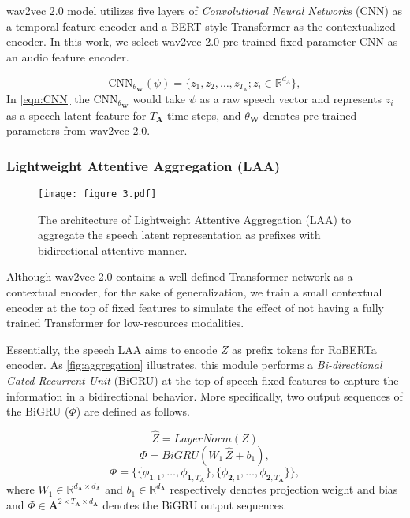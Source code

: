 \documentclass[letterpaper]{article} \usepackage{spconf,amsmath,graphicx}
\begin{document}
wav2vec 2.0 model \cite{baevski2020wav2vec} utilizes five layers of \textit{Convolutional Neural Networks} (CNN) as a temporal feature encoder and a BERT-style Transformer as the contextualized encoder. In this work, we select wav2vec 2.0 pre-trained fixed-parameter CNN as an audio feature encoder.

\begin{equation}
\label{eqn:CNN}
    \text{CNN}_{\theta_{\mathbf{W}}}(\psi) = \{z_1, z_2, \dots, z_{T_{\mathbb{A}}}; z_{i} \in \mathbb{R}^{d_{A}}\},
\end{equation}In \autoref{eqn:CNN} the CNN$_{\theta_{\mathbf{W}}}$ would take $\psi$ as a raw speech vector and represents $z_{i}$ as a speech latent feature for $T_{\mathbf{A}}$ time-steps, and  $\theta_{\mathbf{W}}$ denotes pre-trained parameters from wav2vec 2.0.

\subsubsection{Lightweight Attentive Aggregation (LAA)}


\begin{figure}[tp]
\centering
\texttt{[image: figure\_3.pdf]} \caption{The architecture of Lightweight Attentive Aggregation (LAA) to aggregate the speech latent representation as prefixes with bidirectional attentive manner.}
\label{fig:aggregation}
\end{figure}

Although wav2vec 2.0 contains a well-defined Transformer network as a contextual encoder, for the sake of generalization, we train a small contextual encoder at the top of fixed features to simulate the effect of not having a fully trained Transformer for low-resources modalities.

Essentially, the speech LAA aims to encode $Z$ as prefix tokens for RoBERTa encoder. As \autoref{fig:aggregation} illustrates, this module performs a \textit{Bi-directional Gated Recurrent Unit} (BiGRU) at the top of speech fixed features to capture the information in a bidirectional behavior. More specifically, two output sequences of the BiGRU ($\Phi$) are defined as follows.

\begin{equation}
    \hat{Z} = LayerNorm(Z)
    \label{eqn:prj}
\end{equation}
\begin{equation}
    \Phi = BiGRU(W_{1} ^{\intercal} \hat{Z} + b_{1}),
\end{equation}
\begin{equation}
    \Phi = \{\{\phi_{\mathbf{1}, 1}, \ldots, \phi_{\mathbf{1}, T_{\mathbf{A}}}\}, \{\phi_{\mathbf{2}, 1}, \dots, \phi_{\mathbf{2}, T_{\mathbf{A}}} \}\},
\end{equation}where $W_{1} \in \mathbb{R}^{d_{\mathbf{A}} \times d_{\mathbf{A}}}$ and $b_{1} \in \mathbb{R}^{d_{\mathbf{A}}}$ respectively denotes projection weight and bias and $\Phi \in \mathbf{A}^{2 \times T_{\mathbf{A}} \times d_{\mathbf{A}}}$ denotes the BiGRU output sequences.
\end{document}
